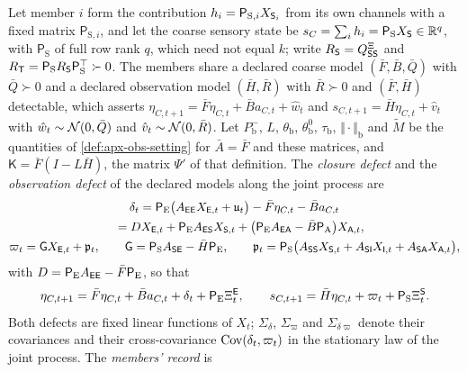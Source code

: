 \begin{definition}\label{def:apx-blanket-setting}
Let member $i$ form the contribution $h_i=\mathsf P_{\mathrm S,i}X_{\mathsf{S}_i}$ from its own channels with a fixed matrix $\mathsf P_{\mathrm S,i}$, and let the coarse sensory state be $s_C=\sum_ih_i=\mathsf P_{\mathrm S}X_{\mathsf{S}}\in\mathbb{R}^q$, with $\mathsf P_{\mathrm S}$ of full row rank $q$, which need not equal $k$; write $R_{\mathsf{S}}=Q^{\Xi}_{\mathsf{S}\mathsf{S}}$ and $R_{\mathsf T}=\mathsf P_{\mathrm S}R_{\mathsf{S}}\mathsf P_{\mathrm S}^\top\succ0$. The members share a declared coarse model $(\bar F,\bar B,\bar Q)$ with $\bar Q\succ0$ and a declared observation model $(\bar H,\bar R)$ with $\bar R\succ0$ and $(\bar F,\bar H)$ detectable, which asserts $\eta_{C,t+1}=\bar F\eta_{C,t}+\bar Ba_{C,t}+\hat w_t$ and $s_{C,t+1}=\bar H\eta_{C,t}+\hat v_t$ with $\hat w_t\sim\mathcal{N}(0,\bar Q)$ and $\hat v_t\sim\mathcal{N}(0,\bar R)$. Let $P^-_{\mathrm b}$, $L$, $\theta_{\mathrm b}$, $\theta^0_{\mathrm b}$, $\tau_{\mathrm b}$, $\Vert\cdot\Vert_{\mathrm b}$ and $\tilde M$ be the quantities of \cref{def:apx-obs-setting} for $\bar A=\bar F$ and these matrices, and $\mathsf K=\bar F(I-L\bar H)$, the matrix $\Psi'$ of that definition. The \emph{closure defect} and the \emph{observation defect} of the declared models along the joint process are
\begin{equation}\label{eq:apx-blanket-defects}
\begin{gathered}
\delta_t=\mathsf P_{\mathrm E}\bigl(A_{\mathsf{E}\mathsf{E}}X_{\mathsf{E},t}+\mathfrak u_t\bigr)-\bar F\eta_{C,t}-\bar Ba_{C,t}\\
\phantom{\delta_t}=DX_{\mathsf{E},t}+\mathsf P_{\mathrm E}A_{\mathsf{E}\mathsf{S}}X_{\mathsf{S},t}+\bigl(\mathsf P_{\mathrm E}A_{\mathsf{E}\mathsf{A}}-\bar B\mathsf P_{\mathrm A}\bigr)X_{\mathsf{A},t},\\
\varpi_t=\mathsf GX_{\mathsf{E},t}+\mathfrak p_t,\qquad\mathsf G=\mathsf P_{\mathrm S}A_{\mathsf{S}\mathsf{E}}-\bar H\mathsf P_{\mathrm E},\qquad\mathfrak p_t=\mathsf P_{\mathrm S}\bigl(A_{\mathsf{S}\mathsf{S}}X_{\mathsf{S},t}+A_{\mathsf{S}\mathsf{I}}X_{\mathsf{I},t}+A_{\mathsf{S}\mathsf{A}}X_{\mathsf{A},t}\bigr),
\end{gathered}
\end{equation}
with $D=\mathsf P_{\mathrm E}A_{\mathsf{E}\mathsf{E}}-\bar F\mathsf P_{\mathrm E}$, so that
\begin{equation}\label{eq:apx-blanket-coarse}
\eta_{C,t+1}=\bar F\eta_{C,t}+\bar Ba_{C,t}+\delta_t+\mathsf P_{\mathrm E}\Xi^{\mathsf{E}}_t,\qquad s_{C,t+1}=\bar H\eta_{C,t}+\varpi_t+\mathsf P_{\mathrm S}\Xi^{\mathsf{S}}_t .
\end{equation}
Both defects are fixed linear functions of $X_t$; $\Sigma_\delta$, $\Sigma_\varpi$ and $\Sigma_{\delta\varpi}$ denote their covariances and their cross-covariance $\operatorname{Cov}(\delta_t,\varpi_t)$ in the stationary law of the joint process. The \emph{members' record} is

\end{definition}
